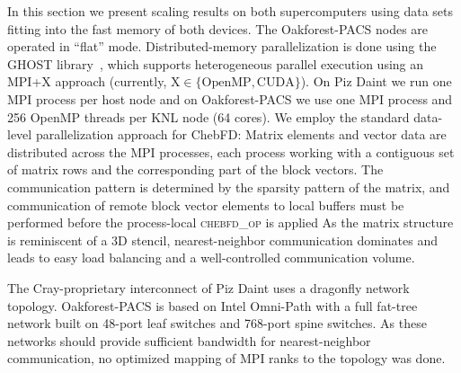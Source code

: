 \documentclass[letterpaper]{llncs}
\newcommand{\OFP}{Oakforest-PACS\xspace}
\begin{document}
In this section we present scaling results on both supercomputers
using data sets fitting into the fast memory of both devices.
The \OFP nodes are
operated in ``flat'' mode. Distributed-memory parallelization is done
using the GHOST library~\cite{GHOST}, which supports heterogeneous
parallel execution using an MPI+X approach (currently, X${}\in\{\text{OpenMP},\text{CUDA}\}$).
On Piz Daint we run one MPI
process per host node and on \OFP we use one MPI process and 256
OpenMP threads per KNL node (64 cores). We employ the standard data-level
parallelization approach for ChebFD:
Matrix elements and vector data are distributed across the
MPI processes, each process working with a contiguous set of matrix rows
and the corresponding part of the block vectors. The communication
pattern is determined by the sparsity pattern of the matrix, and
communication of remote block vector elements to local buffers must be
performed before the process-local \textsc{chebfd\_op} is applied
As the matrix structure is reminiscent of a 3D stencil,
nearest-neighbor communication dominates and leads to easy load
balancing and a well-controlled communication volume.

The Cray-proprietary interconnect of Piz Daint uses
a dragonfly network topology. \OFP is based on Intel Omni-Path
with a full fat-tree network built on 48-port
leaf switches and 768-port spine switches. As these networks
should provide sufficient bandwidth for
nearest-neighbor communication, no optimized mapping of MPI ranks to
the topology was done. 
\end{document}
